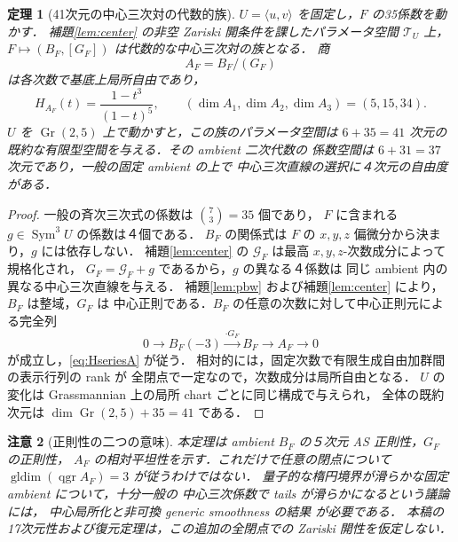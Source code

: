 \documentclass[11pt,a4paper]{ltjsarticle}
\numberwithin{equation}{section}
\newtheorem{theorem}{定理}[section]
\newtheorem{remark}[theorem]{注意}
\newcommand{\Sym}{\operatorname{Sym}}
\newcommand{\qgr}{\operatorname{qgr}}
\newcommand{\gldim}{\operatorname{gldim}}
\begin{document}
\begin{theorem}[41次元の中心三次対の代数的族]\label{thm:incidence}
$U=\langle u,v\rangle$ を固定し，$F$ の35係数を動かす．
補題\ref{lem:center} の非空 Zariski 開条件を課したパラメータ空間
$\mathcal T_U$ 上，$F\mapsto(B_F,[G_F])$ は代数的な中心三次対の族となる．
商
\begin{equation}\label{eq:A}
 A_F=B_F/(G_F)
\end{equation}
は各次数で基底上局所自由であり，
\begin{equation}\label{eq:HseriesA}
 H_{A_F}(t)=\frac{1-t^3}{(1-t)^5},\qquad
 (\dim A_1,\dim A_2,\dim A_3)=(5,15,34).
\end{equation}
$U$ を $\operatorname{Gr}(2,5)$ 上で動かすと，この族のパラメータ空間は
$6+35=41$ 次元の既約な有限型空間を与える．その ambient 二次代数の
係数空間は $6+31=37$ 次元であり，一般の固定 ambient の上で
中心三次直線の選択に４次元の自由度がある．
\end{theorem}
\begin{proof}
一般の斉次三次式の係数は $\binom{7}{3}=35$ 個であり，
$F$ に含まれる $g\in\Sym^3U$ の係数は４個である．
$B_F$ の関係式は $F$ の $x,y,z$ 偏微分から決まり，$g$ には依存しない．
補題\ref{lem:center} の $\mathcal G_F$ は最高 $x,y,z$-次数成分によって規格化され，
$G_F=\mathcal G_F+g$ であるから，$g$ の異なる４係数は
同じ ambient 内の異なる中心三次直線を与える．
補題\ref{lem:pbw} および補題\ref{lem:center} により，$B_F$ は整域，$G_F$ は
中心正則である．$B_F$ の任意の次数に対して中心正則元による完全列
\[
 0\longrightarrow B_F(-3)\xrightarrow{\cdot G_F}
 B_F\longrightarrow A_F\longrightarrow0
\]
が成立し，\eqref{eq:HseriesA} が従う．
相対的には，固定次数で有限生成自由加群間の表示行列の rank が
全閉点で一定なので，次数成分は局所自由となる．
$U$ の変化は Grassmannian 上の局所 chart ごとに同じ構成で与えられ，
全体の既約次元は $\dim\operatorname{Gr}(2,5)+35=41$ である．
\end{proof}

\begin{remark}[正則性の二つの意味]\label{rem:regularity}
本定理は ambient $B_F$ の５次元 AS 正則性，$G_F$ の正則性，
$A_F$ の相対平坦性を示す．これだけで任意の閉点について
$\gldim(\qgr A_F)=3$ が従うわけではない．
量子的な楕円境界が滑らかな固定 ambient について，十分一般の
中心三次係数で tails が滑らかになるという議論には，
中心局所化と非可換 generic smoothness の結果
\cite{RSVdB,Rains} が必要である．
本稿の17次元性および復元定理は，この追加の全閉点での
Zariski 開性を仮定しない．
\end{remark}
\end{document}
